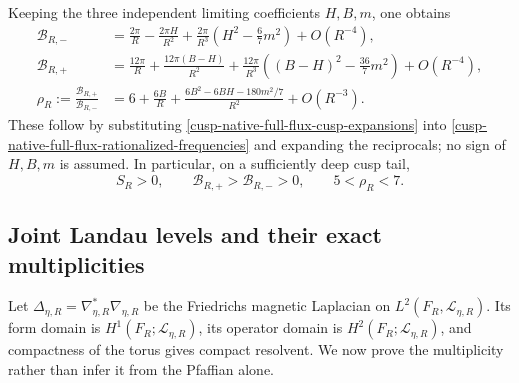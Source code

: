Keeping the three independent limiting coefficients \(H,B,m\), one obtains
\begin{align}
 \mathcal B_{R,-}
 &=\frac{2\pi}{R}-\frac{2\pi H}{R^2}
 +\frac{2\pi}{R^3}\left(H^2-\frac67m^2\right)+O(R^{-4}),
 \label{cusp-native-full-flux-Bminus-expansion}\\
 \mathcal B_{R,+}
 &=\frac{12\pi}{R}+\frac{12\pi(B-H)}{R^2}
 +\frac{12\pi}{R^3}
 \left((B-H)^2-\frac{36}{7}m^2\right)+O(R^{-4}),
 \label{cusp-native-full-flux-Bplus-expansion}\\
 \rho_R:=\frac{\mathcal B_{R,+}}{\mathcal B_{R,-}}
 &=6+\frac{6B}{R}
 +\frac{6B^2-6BH-180m^2/7}{R^2}+O(R^{-3}).
 \label{cusp-native-full-flux-ratio-expansion}
\end{align}
These follow by substituting \cref{cusp-native-full-flux-cusp-expansions}
into \cref{cusp-native-full-flux-rationalized-frequencies} and expanding the
reciprocals; no sign of \(H,B,m\) is assumed.  In particular, on a sufficiently
deep cusp tail,
\begin{equation}
 S_R>0,
 \qquad \mathcal B_{R,+}>\mathcal B_{R,-}>0,
 \qquad 5<\rho_R<7.
 \label{cusp-native-full-flux-deep-tail-window}
\end{equation}

\subsection{Joint Landau levels and their exact multiplicities}

Let \(\Delta_{\eta,R}=\nabla_{\eta,R}^*\nabla_{\eta,R}\) be the Friedrichs
magnetic Laplacian on \(L^2(F_R,\mathscr L_{\eta,R})\).  Its form domain is
\(H^1(F_R;\mathscr L_{\eta,R})\), its operator domain is
\(H^2(F_R;\mathscr L_{\eta,R})\), and compactness of the torus gives compact
resolvent.  We now prove the multiplicity rather than infer it from the
Pfaffian alone.

